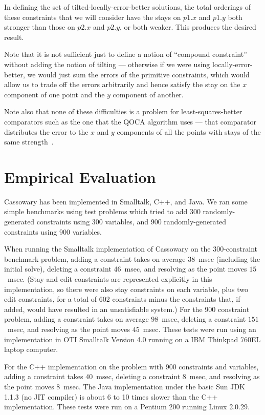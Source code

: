 \documentclass{article}
\begin{document}
In defining the set of tilted-locally-error-better solutions, the total
orderings of these constraints that we will consider have the stays on
$p1.x$ and $p1.y$ both stronger than those on $p2.x$ and $p2.y$, or both
weaker.  This produces the desired result.

Note that it is not sufficient just to define a notion of ``compound
constraint'' without adding the notion of tilting --- otherwise if we were
using locally-error-better, we would just sum the errors of the 
primitive constraints, which would allow us to trade off the errors
arbitrarily and hence satisfy the stay on the $x$ component of one point
and the $y$ component of another.

Note also that none of these difficulties is a problem for least-squares-better
comparators such as the one that the QOCA algorithm uses --- that
comparator distributes the error to the $x$ and $y$ components of all
the points with stays of the same strength~\cite{borning-simplex-tr}.

\section{Empirical Evaluation}
\label{empirical-evaluation}

Cassowary has been implemented in Smalltalk, C++, and Java. We ran some
simple benchmarks using test problems which tried to add 300
randomly-generated constraints using 300 variables, and 900
randomly-generated constraints using 900 variables.

When running the Smalltalk implementation of Cassowary on the 300-constraint
benchmark problem, adding a constraint takes on average $38$~msec
(including the initial solve), deleting a constraint $46$~msec, and
resolving as the point moves $15$~msec.  (Stay and edit constraints are
represented explicitly in this implementation, so there were also stay
constraints on each variable, plus two edit constraints, for a total of
602 constraints minus the constraints that, if added, would have
resulted in an unsatisfiable system.)  For the 900 constraint problem,
adding a constraint takes on average $98$~msec, deleting a constraint
$151$~msec, and resolving as the point moves $45$~msec.  These tests
were run using an implementation in OTI Smalltalk Version 4.0 running on
a IBM Thinkpad 760EL laptop computer.

For the C++ implementation on the problem with 900 constraints and
variables, adding a constraint takes $40$~msec, deleting a constraint
$8$~msec, and resolving as the point moves $8$~msec.  The Java
implementation under the basic Sun JDK 1.1.3 (no JIT compiler) is about 6
to 10 times slower than the C++ implementation.  These tests were run on
a Pentium 200 running Linux 2.0.29.
\end{document}
